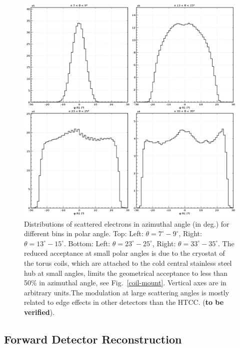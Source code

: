 \documentclass[final,3p,twocolumn]{elsarticle}
\begin{document}
\begin{figure}[t!]
\centerline{\includegraphics[width=0.95\columnwidth]{e_R1_phi_pub.png}}
\caption{Distributions of scattered electrons in azimuthal angle (in deg.) for different bins in polar
  angle. Top: Left: $\theta = 7^\circ-9^\circ$, Right: $\theta = 13^\circ-15^\circ$. Bottom: Left: $\theta = 23^\circ-25^\circ$,
  Right: $\theta = 33^\circ-35^\circ$. The
  reduced acceptance at small polar angles is due to the cryostat of the torus coils, which are attached to 
  the cold central stainless steel hub at small angles, limits the geometrical acceptance to less than 
  50\% in azimuthal angle, see Fig.~\ref{coil-mount}. Vertical axes are in arbitrary units.The modulation at 
  large scattering angles is mostly related to edge effects in other detectors than the HTCC. ({\bf to be verified}).}
\label{e-accept}
\end{figure}

\subsection{Forward Detector Reconstruction} 
\end{document}
